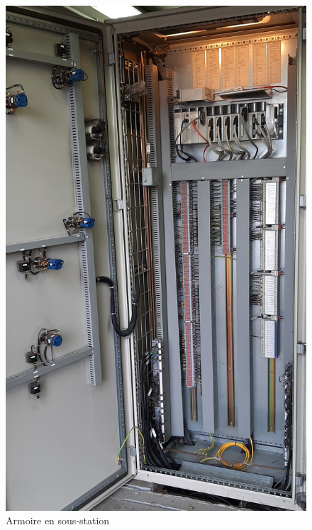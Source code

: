 \documentclass{article}
\begin{document}
\begin{figure}[!h]
                \includegraphics[scale = 0.1]{Images/sousStation2.jpg}
                \caption{Armoire en sous-station}
            \end{figure}

        \pagebreak
\end{document}
